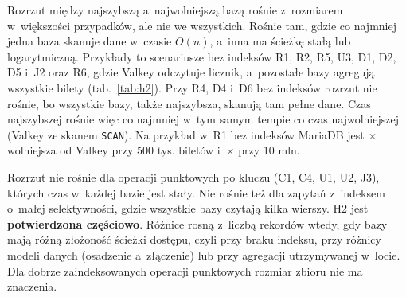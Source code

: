 Rozrzut między najszybszą a~najwolniejszą bazą rośnie z~rozmiarem w~większości
przypadków, ale nie we wszystkich. Rośnie tam, gdzie co najmniej jedna baza
skanuje dane w~czasie $O(n)$, a~inna ma ścieżkę stałą lub logarytmiczną.
Przykłady to scenariusze bez indeksów R1, R2, R5, U3, D1, D2, D5 i~J2 oraz
R6, gdzie Valkey odczytuje licznik, a~pozostałe bazy agregują wszystkie bilety
(tab.~\ref{tab:h2}). Przy R4, D4 i~D6 bez indeksów rozrzut nie rośnie, bo
wszystkie bazy, także najszybsza, skanują tam pełne dane. Czas najszybszej
rośnie więc co najmniej w~tym samym tempie co czas najwolniejszej (Valkey ze
skanem \texttt{SCAN}).
Na przykład w~R1 bez indeksów MariaDB jest
$\times$ wolniejsza od Valkey przy
500 tys. biletów i~$\times$ przy
10 mln.

Rozrzut nie rośnie dla operacji punktowych po kluczu (C1, C4, U1, U2, J3),
których czas w~każdej bazie jest stały. Nie rośnie też dla zapytań z~indeksem
o~małej selektywności, gdzie wszystkie bazy czytają kilka wierszy. H2 jest
\textbf{potwierdzona częściowo}. Różnice rosną z~liczbą rekordów wtedy, gdy
bazy mają różną złożoność ścieżki dostępu, czyli przy braku indeksu, przy
różnicy modeli danych (osadzenie a~złączenie) lub przy agregacji
utrzymywanej w~locie. Dla dobrze zaindeksowanych operacji punktowych rozmiar
zbioru nie ma znaczenia.
